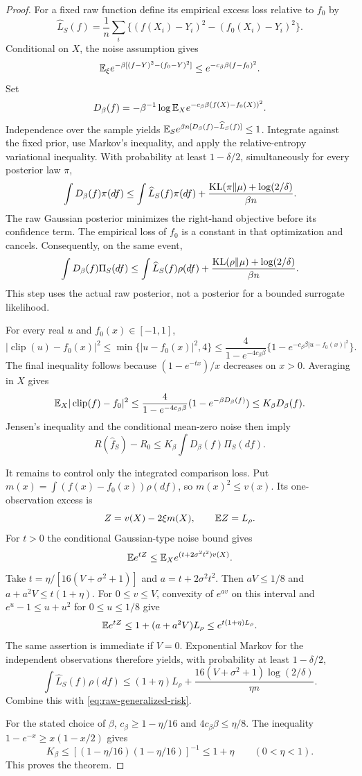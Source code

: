 \begin{proof}
For a fixed raw function define its empirical excess loss relative to $f_0$ by
\[
 \widehat L_S(f)=\frac1n\sum_i
       \{(f(X_i)-Y_i)^2-(f_0(X_i)-Y_i)^2\}.
\]
Conditional on $X$, the noise assumption gives
\[
 \mathbb E_\xi e^{-\beta[(f-Y)^2-(f_0-Y)^2]}
 \le e^{-c_\beta\beta(f-f_0)^2}.
\]
Set
\[
 D_\beta(f)=-\beta^{-1}\log
           \mathbb E_Xe^{-c_\beta\beta(f(X)-f_0(X))^2}.
\]
Independence over the sample yields
$\mathbb E_S e^{\beta n[D_\beta(f)-\widehat L_S(f)]}\le1$.
Integrate against the fixed prior, use Markov's inequality, and apply the relative-entropy variational inequality. With probability at least $1-\delta/2$, simultaneously for every posterior law $\pi$,
\[
 \int D_\beta(f)\pi(df)
 \le\int\widehat L_S(f)\pi(df)
       +\frac{\operatorname{KL}(\pi\|\mu)+\log(2/\delta)}{\beta n}.
\]
The raw Gaussian posterior minimizes the right-hand objective before its confidence term. The empirical loss of $f_0$ is a constant in that optimization and cancels. Consequently, on the same event,
\begin{equation}
 \int D_\beta(f)\Pi_S(df)
 \le\int\widehat L_S(f)\rho(df)
       +\frac{\operatorname{KL}(\rho\|\mu)+\log(2/\delta)}{\beta n}.
 \label{eq:raw-generalized-risk}
\end{equation}
This step uses the actual raw posterior, not a posterior for a bounded surrogate likelihood.

For every real $u$ and $f_0(x)\in[-1,1]$,
\[
 |\operatorname{clip}(u)-f_0(x)|^2
 \le\min\{|u-f_0(x)|^2,4\}
 \le\frac4{1-e^{-4c_\beta\beta}}
            \{1-e^{-c_\beta\beta|u-f_0(x)|^2}\}.
\]
The final inequality follows because $(1-e^{-tx})/x$ decreases on $x>0$. Averaging in $X$ gives
\[
 \mathbb E_X|\operatorname{clip}(f)-f_0|^2
 \le\frac4{1-e^{-4c_\beta\beta}}(1-e^{-\beta D_\beta(f)})
 \le K_\beta D_\beta(f).
\]
Jensen's inequality and the conditional mean-zero noise then imply
\[
 R(\widehat f_S)-R_0
 \le K_\beta\int D_\beta(f)\Pi_S(df).
\]

It remains to control only the integrated comparison loss. Put
$m(x)=\int(f(x)-f_0(x))\rho(df)$, so $m(x)^2\le v(x)$. Its one-observation excess is
\[
 Z=v(X)-2\xi m(X),\qquad \mathbb E Z=L_\rho.
\]
For $t>0$ the conditional Gaussian-type noise bound gives
\[
 \mathbb E e^{tZ}\le\mathbb E_Xe^{(t+2\sigma^2t^2)v(X)}.
\]
Take $t=\eta/[16(V+\sigma^2+1)]$ and $a=t+2\sigma^2t^2$. Then $aV\le1/8$ and
$a+a^2V\le t(1+\eta)$.
For $0\le v\le V$, convexity of $e^{av}$ on this interval and $e^u-1\le u+u^2$ for $0\le u\le1/8$ give
\[
 \mathbb E e^{tZ}\le1+(a+a^2V)L_\rho
             \le e^{t(1+\eta)L_\rho}.
\]
The same assertion is immediate if $V=0$. Exponential Markov for the independent observations therefore yields, with probability at least $1-\delta/2$,
\[
 \int\widehat L_S(f)\rho(df)
 \le(1+\eta)L_\rho+
       \frac{16(V+\sigma^2+1)\log(2/\delta)}{\eta n}.
\]
Combine this with \eqref{eq:raw-generalized-risk}.

For the stated choice of $\beta$, $c_\beta\ge1-\eta/16$ and $4c_\beta\beta\le\eta/8$. The inequality $1-e^{-x}\ge x(1-x/2)$ gives
\[
 K_\beta\le[(1-\eta/16)(1-\eta/16)]^{-1}\le1+\eta
 \qquad(0<\eta<1).
\]
This proves the theorem.
\end{proof}


